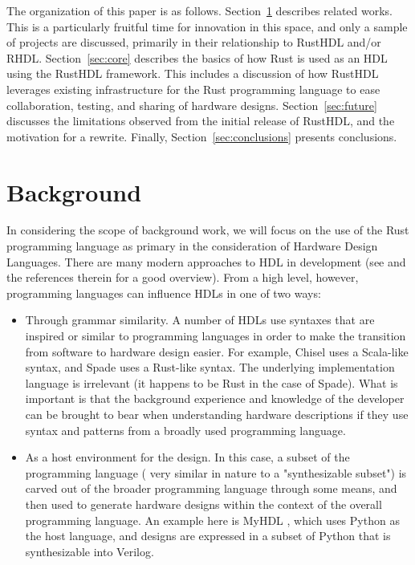 \documentclass[conference]{IEEEtran}
\begin{document}
The organization of this paper is as follows.  Section~\ref{sec:related} describes related
works.  This is a particularly fruitful time for innovation in this space, and only a
sample of projects are discussed, primarily in their relationship to RustHDL and/or RHDL.
Section~\ref{sec:core} describes the basics of how Rust is used as an HDL using the RustHDL
framework.  This includes a discussion of how RustHDL leverages existing infrastructure 
for the Rust programming language to ease collaboration, testing, and sharing of hardware 
designs.  Section~\ref{sec:future} discusses the limitations observed from the initial
release of RustHDL, and the motivation for a rewrite.  Finally, Section~\ref{sec:conclusions}
presents conclusions.

\section{Background}\label{sec:related}

In considering the scope of background work, we will focus on the use of the Rust programming
language as primary in the consideration of Hardware Design Languages.  There are many modern
approaches to HDL in development (see \cite{b1} and the references therein for a good overview).  
From a high level, however, programming languages can influence HDLs in one of two ways:

\begin{itemize}
  \item Through grammar similarity.  A number of HDLs use syntaxes that are inspired or similar to
  programming languages in order to make the transition from software to hardware design easier.
  For example, Chisel \cite{b2} uses a Scala-like syntax, and Spade \cite{b1} uses a Rust-like syntax.
  The underlying implementation language is irrelevant (it happens to be Rust in the case of Spade).
  What is important is that the background experience and knowledge of the developer can be brought 
  to bear when understanding hardware descriptions if they use syntax and patterns from a broadly
  used programming language.
  \item As a host environment for the design.  In this case, a subset of the programming language (
    very similar in nature to a "synthesizable subset") is carved out of the broader programming language
    through some means, and then used to generate hardware designs within the context of the overall
    programming language.  An example here is MyHDL \cite{b3}, which uses Python as the host language, and 
    designs are expressed in a subset of Python that is synthesizable into Verilog.
\end{itemize}
\end{document}

